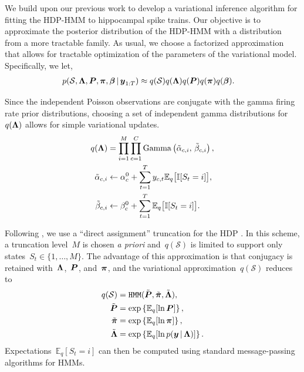 We build upon our previous work \citep{Chen12a,Chen14,Johnson14} to develop a variational inference algorithm for fitting the HDP-HMM to hippocampal spike trains. Our objective is to approximate the posterior distribution of the HDP-HMM with a distribution from a more tractable family. As usual, we choose a factorized approximation that allows for tractable optimization of the parameters of the variational model. Specifically, we let,
\begin{align}
p(\mathcal{S}, \boldsymbol{\Lambda}, \boldsymbol{P}, \boldsymbol{\pi}, \boldsymbol{\beta} \,|\, \boldsymbol{y}_{1:T}) &\approx q(\mathcal{S}) q(\boldsymbol{\Lambda}) q(\boldsymbol{P}) q(\boldsymbol{\pi}) q(\boldsymbol{\beta}).
\end{align}

Since the independent Poisson observations are conjugate with the gamma firing rate prior distributions, choosing a set of independent gamma distributions for~$q(\boldsymbol{\Lambda})$ allows for simple variational updates.
\begin{align}
q(\boldsymbol{\Lambda}) &= \prod_{i=1}^M \prod_{c=1}^C \mathrm{Gamma}\left(\tilde{\alpha}_{c,i},\, \tilde{\beta}_{c,i} \right), \\
\nonumber \tilde{\alpha}_{c,i} &\leftarrow \alpha_c^{0} + \sum_{t=1}^T y_{c,t} \mathbb{E}_q\big[\mathbb{I}[S_t=i]\big], \\
\nonumber \tilde{\beta}_{c,i} &\leftarrow\beta_c^{0} + \sum_{t=1}^T \mathbb{E}_q\big[\mathbb{I}[S_t=i]\big].
\end{align}

Following \citep{Johnson14}, we use a ``direct assignment'' truncation for the HDP \citep{Bryant12, Liang07}. In this scheme, a truncation level~$M$ is chosen {\it a priori} and~$q(\mathcal{S})$ is limited to support only states~${S_t\in\{1,\ldots,M\}}$. The advantage of this approximation is that conjugacy is retained with~$\boldsymbol{\Lambda}$,~$\boldsymbol{P}$, and~$\boldsymbol{\pi}$, and the variational approximation~$q(\mathcal{S})$ reduces to
\begin{align}
q(\mathcal{S}) &= \texttt{HMM}(\tilde{\boldsymbol{P}}, \tilde{\boldsymbol{\pi}}, \tilde{\boldsymbol{\Lambda}}), \\
\nonumber \tilde{\boldsymbol{P}} &= \exp\left\{\mathbb{E}_q[\ln \boldsymbol{P}]\right\}, \\
\nonumber \tilde{\boldsymbol{\pi}} &= \exp\left\{\mathbb{E}_q[\ln \boldsymbol{\pi}]\right\}, \\
\nonumber \tilde{\boldsymbol{\Lambda}} &= \exp\left\{\mathbb{E}_q[\ln p(\boldsymbol{y} \,|\, \boldsymbol{\Lambda})]\right\}.
\end{align}
Expectations~${\mathbb{E}_q[S_t=i]}$ can then be computed using standard message-passing algorithms for HMMs.

